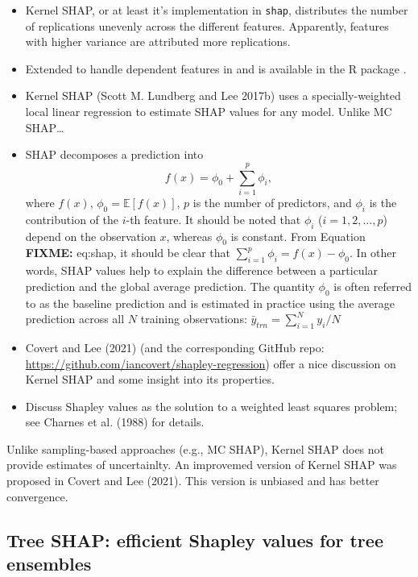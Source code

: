 \begin{itemize}
\item
  Kernel SHAP, or at least it's implementation in \texttt{shap}, distributes the number of replications unevenly across the different features. Apparently, features with higher variance are attributed more replications.
\item
  Extended to handle dependent features in \citet{aas-2020-explaining} and is available in the R package  \citep{R-shapr}.
\item
  Kernel SHAP (Scott M. Lundberg and Lee 2017b) uses a specially-weighted local linear regression to estimate SHAP values for any model. Unlike MC SHAP\ldots{}
\item
  SHAP decomposes a prediction into
  \begin{equation}
    f\left(x\right) = \phi_0 + \sum_{i = 1} ^ p \phi_i,
  \end{equation}
  where \(f\left(x\right)\), \(\phi_0 = \mathbb{E}\left[f\left(x\right)\right]\), \(p\) is the number of predictors, and \(\phi_i\) is the contribution of the \(i\)-th feature. It should be noted that \(\phi_i\) (\(i = 1, 2, \dots, p\)) depend on the observation \(x\), whereas \(\phi_0\) is constant. From Equation \textbf{FIXME:} eq:shap, it should be clear that \(\sum_{i = 1}^p \phi_i = f\left(x\right) - \phi_0\). In other words, SHAP values help to explain the difference between a particular prediction and the global average prediction. The quantity \(\phi_0\) is often referred to as the baseline prediction and is estimated in practice using the average prediction across all \(N\) training observations: \(\bar{y}_{trn} = \sum_{i = 1}^N y_i / N\)
\item
  Covert and Lee (2021) (and the corresponding GitHub repo: \url{https://github.com/iancovert/shapley-regression}) offer a nice discussion on Kernel SHAP and some insight into its properties.
\item
  Discuss Shapley values as the solution to a weighted least squares problem; see Charnes et al. (1988) for details.
\end{itemize}

Unlike sampling-based approaches (e.g., MC SHAP), Kernel SHAP does not provide estimates of uncertainlty. An improvemed version of Kernel SHAP was proposed in Covert and Lee (2021). This version is unbiased and has better convergence.

\hypertarget{tree-shap-efficient-shapley-values-for-tree-ensembles}{%
\subsection{Tree SHAP: efficient Shapley values for tree ensembles}\label{tree-shap-efficient-shapley-values-for-tree-ensembles}}

